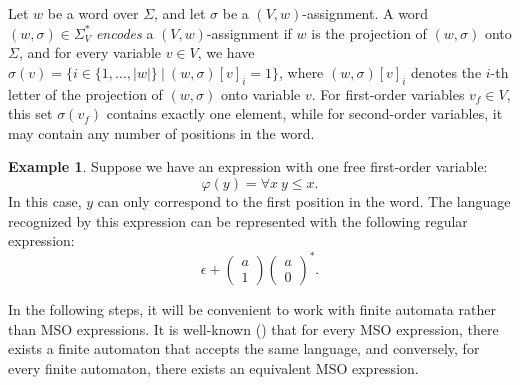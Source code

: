 \documentclass[en]{pracamgr}
\newcommand{\icol}[1]{%
  \left(\begin{smallmatrix}#1\end{smallmatrix}\right)%
}
\theoremstyle{definition}
\newtheorem{example}{Example}[section]
\begin{document}
Let $w$ be a word over $\Sigma$, and let $\sigma$ be a $(V, w)$-assignment. A word $(w, \sigma) \in \Sigma_V^*$ \emph{encodes} a $(V, w)$-assignment if $w$ is the projection of $(w, \sigma)$ onto $\Sigma$, and for every variable $v \in V$, we have $\sigma(v) = \{i \in \{1,\ldots,|w|\} \ | \ (w, \sigma)[v]_i = 1 \}$, where $(w, \sigma)[v]_i$ denotes the $i$-th letter of the projection of $(w, \sigma)$ onto variable $v$. For first-order variables $v_f \in V$, this set $\sigma(v_f)$ contains exactly one element, while for second-order variables, it may contain any number of positions in the word.

\begin{example}
    Suppose we have an expression with one free first-order variable:
    $$\varphi(y) = \forall x \ y \leq x.$$
    In this case, $y$ can only correspond to the first position in the word. The language recognized by this expression can be represented with the following regular expression: 
    $$\epsilon + \icol{a\\1}\icol{a\\0}^*.$$
\end{example}

In the following steps, it will be convenient to work with finite automata rather than MSO expressions. It is well-known (\cite{Buchi1960}) that for every MSO expression, there exists a finite automaton that accepts the same language, and conversely, for every finite automaton, there exists an equivalent MSO expression.
\end{document}
